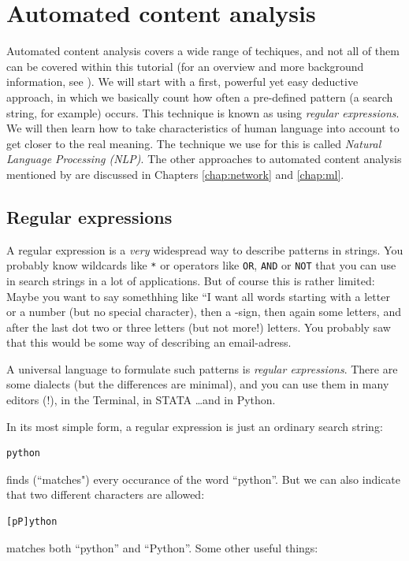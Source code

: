 \documentclass[a4paper,12pt]{book}
\begin{document}
\chapter{Automated content analysis}
Automated content analysis covers a wide range of techiques, and not all of them can be covered within this tutorial (for an overview and more background information, see \cite{Boumans2016}). We will start with a first, powerful yet easy deductive approach, in which we basically count how often a pre-defined pattern (a search string, for example) occurs. This technique is known as using \emph{regular expressions}. We will then learn how to take characteristics of human language into account to get closer to the real meaning. The technique we use for this is called \emph{Natural Language Processing (NLP)}.
The other approaches to automated content analysis mentioned by \cite{Boumans2016} are discussed in Chapters \ref{chap:network} and \ref{chap:ml}.


\section{Regular expressions}
\label{sec:regexp}

A regular expression is a \emph{very} widespread way to describe patterns in strings. You probably know wildcards like {\tt{*}} or operators like {\tt{OR}}, {\tt{AND}} or {\tt{NOT}} that you can use in search strings in a lot of applications. But of course this is rather limited: Maybe you want to say somethhing like ``I want all words starting with a letter or a number (but no special character), then a \@-sign, then again some letters, and after the last dot two or three letters (but not more!) letters. You probably saw that this would be some way of describing an email-adress. 

A universal language to formulate such patterns is \emph{regular expressions}. There are some dialects (but the differences are minimal), and you can use them in many editors (!), in the Terminal, in STATA \ldots and in Python.

In its most simple form, a regular expression is just an ordinary search string:
\begin{lstlisting}
python
\end{lstlisting}
finds (``matches") every occurance of the word ``python''. But we can also indicate that two different characters are allowed:
\begin{lstlisting}
[pP]ython
\end{lstlisting}
matches both ``python'' and ``Python''. Some other useful things:
\end{document}
